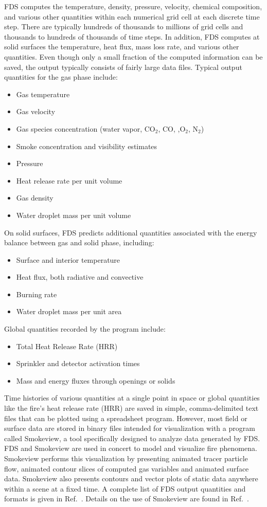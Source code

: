 \documentclass[11pt]{book}
\begin{document}
FDS computes the temperature, density, pressure, velocity, chemical composition, and various other quantities within each numerical grid cell at each discrete time step. There are typically hundreds of thousands to millions of grid cells and thousands to hundreds of thousands of time steps. In addition, FDS computes at solid surfaces the temperature, heat flux, mass loss rate, and various other quantities. Even though only a small fraction of the computed information can be saved, the output typically consists of fairly large data files. Typical output quantities for the gas phase include:
\begin{itemize}
\setlength{\itemsep}{0.0in}
\item Gas temperature
\item Gas velocity
\item Gas species concentration (water vapor, CO$_2$, CO, ,O$_2$, N$_2$)
\item Smoke concentration and visibility estimates
\item Pressure
\item Heat release rate per unit volume
\item Gas density
\item Water droplet mass per unit volume
\end{itemize}
On solid surfaces, FDS predicts additional quantities associated with the energy balance between gas and solid phase, including:
\begin{itemize}
\setlength{\itemsep}{0.0in}
\item Surface and interior temperature
\item Heat flux, both radiative and convective
\item Burning rate
\item Water droplet mass per unit area
\end{itemize}
Global quantities recorded by the program include:
\begin{itemize}
\setlength{\itemsep}{0.0in}
\item Total Heat Release Rate (HRR)
\item Sprinkler and detector activation times
\item Mass and energy fluxes through openings or solids
\end{itemize}
Time histories of various quantities at a single point in space or global quantities like the fire's heat release rate (HRR) are saved in simple, comma-delimited text files that can be plotted using a spreadsheet program. However, most field or surface data are stored in binary files intended for visualization with a program called Smokeview, a tool specifically designed to analyze data generated by FDS. FDS and Smokeview are used in concert to model and visualize fire phenomena. Smokeview performs this visualization by presenting animated tracer particle flow, animated contour slices of computed gas variables and animated surface data. Smokeview also presents contours and vector plots of static data anywhere within a scene at a fixed time. A complete list of FDS output quantities and formats is given in Ref.~\cite{FDS_Users_Guide}. Details on the use of Smokeview are found in Ref.~\cite{Smokeview_Users_Guide}.
\end{document}
